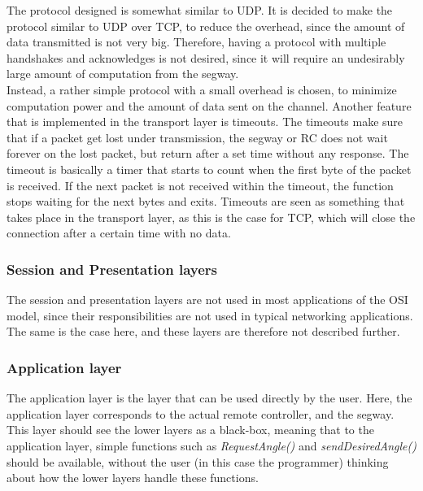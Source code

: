 The protocol designed is somewhat similar to UDP. It is decided to make the protocol similar to UDP over TCP, to reduce the overhead, since the amount of data transmitted is not very big. Therefore, having a protocol with multiple handshakes and acknowledges is not desired, since it will require an undesirably large amount of computation from the segway.\\
Instead, a rather simple protocol with a small overhead is chosen, to minimize computation power and the amount of data sent on the channel. %
Another feature that is implemented in the transport layer is timeouts. The timeouts make sure that if a packet get lost under transmission, the segway or RC does not wait forever on the lost packet, but return after a set time without any response. The timeout is basically a timer that starts to count when the first byte of the packet is received. If the next packet is not received within the timeout, the function stops waiting for the next bytes and exits. Timeouts are seen as something that takes place in the transport layer, as this is the case for TCP, which will close the connection after a certain time with no data.

\subsubsection*{Session and Presentation layers}
The session and presentation layers are not used in most applications of the OSI model, since their responsibilities are not used in typical networking applications. The same is the case here, and these layers are therefore not described further. 

\subsubsection*{Application layer}
The application layer is the layer that can be used directly by the user. Here, the application layer corresponds to the actual remote controller, and the segway. This layer should see the lower layers as a black-box, meaning that to the application layer, simple functions such as \emph{RequestAngle()} and \emph{sendDesiredAngle()} should be available, without the user (in this case the programmer) thinking about how the lower layers handle these functions.


